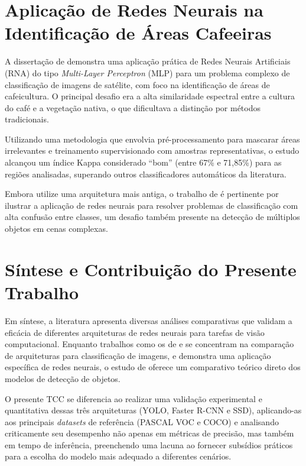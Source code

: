 \section[Aplicação de Redes Neurais na Identificação de Áreas Cafeeiras]{Aplicação de Redes Neurais na\\Identificação de Áreas Cafeeiras}

A dissertação de  demonstra uma aplicação prática de Redes Neurais
Artificiais (RNA) do tipo \textit{Multi-Layer Perceptron} (MLP) para um problema complexo de
classificação de imagens de satélite, com foco na identificação de áreas de cafeicultura. O
principal desafio era a alta similaridade espectral entre a cultura do café e a vegetação
nativa, o que dificultava a distinção por métodos tradicionais.

Utilizando uma metodologia que envolvia pré-processamento para mascarar áreas irrelevantes e
treinamento supervisionado com amostras representativas, o estudo alcançou um índice Kappa
considerado ``bom'' (entre 67\% e 71,85\%) para as regiões analisadas, superando outros
classificadores automáticos da literatura.

Embora utilize uma arquitetura mais antiga, o trabalho de  é pertinente
por ilustrar a aplicação de redes neurais para resolver problemas de classificação com alta
confusão entre classes, um desafio também presente na detecção de múltiplos objetos em cenas
complexas.

\section[Síntese e Contribuição do Presente Trabalho]{Síntese e Contribuição do Presente\\Trabalho}

Em síntese, a literatura apresenta diversas análises comparativas que validam a eficácia de
diferentes arquiteturas de redes neurais para tarefas de visão computacional. Enquanto
trabalhos como os de  e  se concentram na
comparação de arquiteturas para classificação de imagens, e  demonstra
uma aplicação específica de redes neurais, o estudo de  oferece um
comparativo teórico direto dos modelos de detecção de objetos.

O presente TCC se diferencia ao realizar uma validação experimental e quantitativa dessas três
arquiteturas (YOLO, Faster R-CNN e SSD), aplicando-as aos principais \textit{datasets} de
referência (PASCAL VOC e COCO) e analisando criticamente seu desempenho não apenas em métricas
de precisão, mas também em tempo de inferência, preenchendo uma lacuna ao fornecer subsídios
práticos para a escolha do modelo mais adequado a diferentes cenários.
